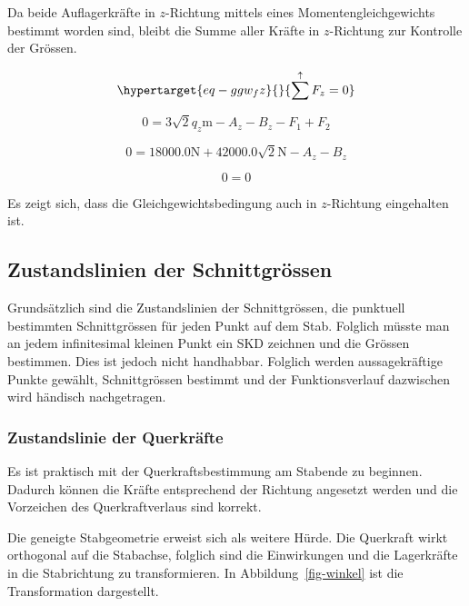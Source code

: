 \documentclass[
  12pt,
  letterpaper,
  DIV=11,
  egregdoesnotlikesansseriftitles]{scrartcl}
\begin{document}
Da beide Auflagerkräfte in \(z\)-Richtung mittels eines
Momentengleichgewichts bestimmt worden sind, bleibt die Summe aller
Kräfte in \(z\)-Richtung zur Kontrolle der Grössen.

\begin{equation}\protect\hypertarget{eq-ggw_fz}{}{
\sum^\uparrow F_z = 0
}\label{eq-ggw_fz}\end{equation}

\begin{equation}0 = 3 \sqrt{2} q_{z} \text{m} - A_{z} - B_{z} - F_{1} + F_{2}\end{equation}

\begin{equation}0 = 18000.0 \text{N} + 42000.0 \sqrt{2} \text{N} - A_{z} - B_{z}\end{equation}

\begin{equation}0 = 0\end{equation}

Es zeigt sich, dass die Gleichgewichtsbedingung auch in \(z\)-Richtung
eingehalten ist.

\hypertarget{zustandslinien-der-schnittgruxf6ssen}{%
\subsection{Zustandslinien der
Schnittgrössen}\label{zustandslinien-der-schnittgruxf6ssen}}

Grundsätzlich sind die Zustandslinien der Schnittgrössen, die punktuell
bestimmten Schnittgrössen für jeden Punkt auf dem Stab. Folglich müsste
man an jedem infinitesimal kleinen Punkt ein SKD zeichnen und die
Grössen bestimmen. Dies ist jedoch nicht handhabbar. Folglich werden
aussagekräftige Punkte gewählt, Schnittgrössen bestimmt und der
Funktionsverlauf dazwischen wird händisch nachgetragen.

\hypertarget{zustandslinie-der-querkruxe4fte}{%
\subsubsection{Zustandslinie der
Querkräfte}\label{zustandslinie-der-querkruxe4fte}}

Es ist praktisch mit der Querkraftsbestimmung am Stabende zu beginnen.
Dadurch können die Kräfte entsprechend der Richtung angesetzt werden und
die Vorzeichen des Querkraftverlaus sind korrekt.

Die geneigte Stabgeometrie erweist sich als weitere Hürde. Die Querkraft
wirkt orthogonal auf die Stabachse, folglich sind die Einwirkungen und
die Lagerkräfte in die Stabrichtung zu transformieren. In
Abbildung~\ref{fig-winkel} ist die Transformation dargestellt.
\end{document}
